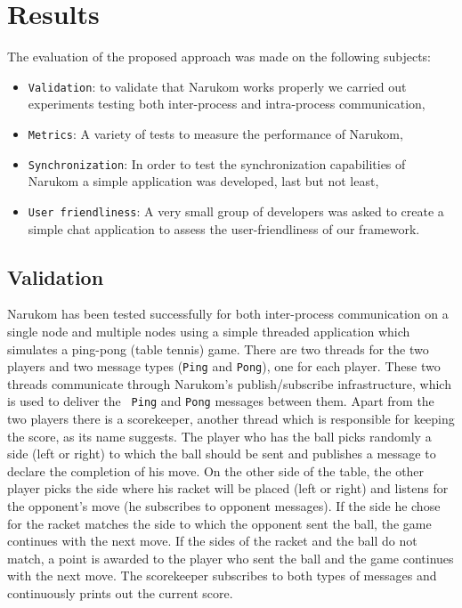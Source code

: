 \chapter{Results}
\label{results}
The evaluation of the proposed approach was made on the following subjects:
\begin{itemize}
\item {\tt Validation}: to validate that Narukom works properly we carried out experiments testing both inter-process and intra-process communication,
\item {\tt Metrics}: A variety of tests to measure the performance of Narukom,
\item {\tt Synchronization}: In order to test the synchronization capabilities of Narukom a simple application was developed, last but not least,
\item {\tt User friendliness}: A very small group of developers was asked to create a simple chat application to assess the user-friendliness of our framework.
\end{itemize}

\section{Validation}
Narukom has been tested successfully for both inter-process communication on a single node and multiple nodes using a
simple threaded application which simulates a ping-pong (table tennis) game. There are two threads for the two
players and two message types ({\tt Ping} and {\tt Pong}), one for each player.
These two threads communicate through Narukom's publish/subscribe infrastructure, which is used to deliver the {\tt
Ping} and
{\tt Pong} messages between them. Apart from the two players there is a scorekeeper, another thread which is responsible
for keeping the score, as its name
suggests. The player who has the ball picks randomly a side (left or right) to which the ball should be sent and
publishes a message to declare the completion of his move. On the other
side of the table, the other player picks the side where his racket will be placed (left or right) and listens for the
opponent's move (he subscribes to opponent messages). If the side he chose for the racket matches the side to which the
opponent sent the ball, the game continues with the next move. If the sides of the racket and the ball do not match, a
point is awarded to the player who sent the ball and the game continues with the next move. The scorekeeper subscribes
to both types of messages and continuously prints out the current score. 

